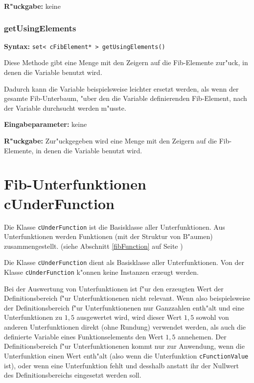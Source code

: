 \bigskip\noindent
\textbf{R"uckgabe:} keine


\subsubsection{getUsingElements}

\textbf{Syntax:} \verb|set< cFibElement* > getUsingElements()|

\bigskip\noindent
Diese Methode gibt eine Menge mit den Zeigern auf die Fib-Elemente zur"uck, in denen die Variable benutzt wird.

Dadurch kann die Variable beispielsweise leichter ersetzt werden, als wenn der gesamte Fib-Unterbaum, "uber den die Variable definierenden Fib-Element, nach der Variable durchsucht werden m"usste.

\bigskip\noindent
\textbf{Eingabeparameter:} keine

\bigskip\noindent
\textbf{R"uckgabe:} Zur"uckgegeben wird eine Menge mit den Zeigern auf die Fib-Elemente, in denen die Variable benutzt wird.



\section{Fib-Unterfunktionen cUnderFunction}

Die Klasse \verb|cUnderFunction| ist die Basisklasse aller Unterfunktionen. Aus Unterfunktionen werden Funktionen (mit der Struktur von B"aumen) zusammengestellt. (siehe Abschnitt \ref{fibFunction} auf Seite\pageref{fibFunction} )

Die Klasse \verb|cUnderFunction| dient als Basisklasse aller Unterfunktionen. Von der Klasse \verb|cUnderFunction| k"onnen keine Instanzen erzeugt werden.

Bei der Auswertung von Unterfunktionen ist f"ur den erzeugten Wert der Definitionsbereich f"ur Unterfunktionenen nicht relevant. Wenn also beispielsweise der Definitionsbereich f"ur Unterfunktionenen nur Ganzzahlen enth"alt und eine Unterfunktionen zu $1,5$ ausgewertet wird, wird dieser Wert $1,5$ sowohl von anderen Unterfunktionen direkt (ohne Rundung) verwendet werden, als auch die definierte Variable eines Funktionselements den Wert $1,5$ annehemen.
Der Definitionsbereich f"ur Unterfunktionenen kommt nur zur Anwendung, wenn die Unterfunktion einen Wert enth"alt (also wenn die Unterfunktion \verb|cFunctionValue| ist), oder wenn eine Unterfunktion fehlt und desshalb anstatt ihr der Nullwert des Definitionsbereichs eingesetzt werden soll.

